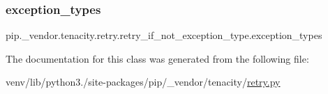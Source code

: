 \subsubsection{\texorpdfstring{exception\+\_\+types}{exception\_types}}
{\footnotesize\ttfamily pip.\+\_\+vendor.\+tenacity.\+retry.\+retry\+\_\+if\+\_\+not\+\_\+exception\+\_\+type.\+exception\+\_\+types\hspace{0.3cm}{\ttfamily [static]}}



The documentation for this class was generated from the following file\+:\begin{DoxyCompactItemize}
\item 
venv/lib/python3./site-\/packages/pip/\+\_\+vendor/tenacity/\hyperlink{tenacity_2retry_8py}{retry.\+py}\end{DoxyCompactItemize}
